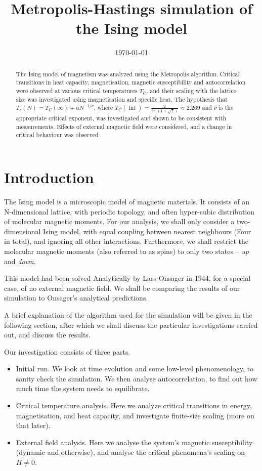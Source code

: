 \documentclass[12pt]{article}
\date{\today}
\title{Metropolis-Hastings simulation of the Ising model}
\begin{document}
\maketitle


\begin{abstract}
  The Ising model of magnetism was analyzed using the Metropolis algorithm. Critical transitions in heat capacity, magnetisation, magnetic susceptibility and autocorrelation were observed at various critical temperatures \(T_C\), and their scaling with the lattice size was investigated using magnetisation and specific heat. The hypothesis that  \(T_c(N) = T_C(\infty) + a N ^{-1/\nu}\), where \(T_C (\inf) = \frac{2}{\ln(1 + \sqrt{2})} \approx 2.269\) and \(\nu\) is the appropriate critical exponent, was investigated and shown to be consistent with measurements. Effects of external magnetic field were considered,  and a change in critical behaviour was observed
\end{abstract}


\section{Introduction}\label{sec:intro}

The Ising model\cite{Ising1925} is a microscopic model of magnetic materials. It consists of an N-dimensional lattice, with periodic topology, and often hyper-cubic distribution of molecular magnetic moments. For our analysis, we shall only consider a two-dimensional Ising model, with equal coupling between nearest neighbours (Four in total), and ignoring all other interactions. Furthermore, we shall restrict the molecular magnetic moments (also referred to as spins) to only two states -- \emph{up} and \emph{down}.

This model had been solved Analytically by Lars Onsager in 1944\cite{Onsager, histIsing}, for a special case, of no external magnetic field. We shall be comparing the results of our simulation to Onsager's analytical predictions.

A brief explanation of the algorithm used for the simulation will be given in the following section, after which we shall discuss the particular investigations carried out, and discuss the results.

Our investigation consists of three parts.

\begin{itemize}
\item Initial run. We look at time evolution and some low-level phenomenology, to sanity check the simulation. We then analyse autocorrelation, to find out how much time the system needs to equilibrate.
\item Critical temperature analysis. Here we analyze critical transitions in energy, magnetisation, and heat capacity, and investigate finite-size scaling (more on that later).
\item External field analysis. Here we analyse the system's magnetic susceptibility (dynamic and otherwise), and analyse the critical phenomena's scaling on \(H \ne 0\). 
\end{itemize}
\end{document}

